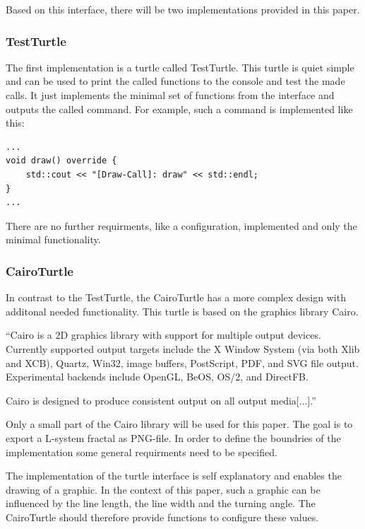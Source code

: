 \documentclass[english]{cpp-hmwk}
\begin{document}
\noindent Based on this interface, there will be two implementations provided in this paper. 

\subsubsection{TestTurtle}

The first implementation is a turtle called TestTurtle. This turtle is quiet simple and can be used to print the called functions to the console and test the made calls.
It just implements the minimal set of functions from the interface and outputs the called command. For example, such a command is implemented like this:

\medskip
\begin{lstlisting}
...
void draw() override {
    std::cout << "[Draw-Call]: draw" << std::endl;
}
...
\end{lstlisting}

There are no further requirments, like a configuration, implemented and only the minimal functionality.

\subsubsection{CairoTurtle}
In contrast to the TestTurtle, the CairoTurtle has a more complex design with additonal needed functionality. This turtle is based on the graphics library Cairo.


``Cairo is a 2D graphics library with support for multiple output devices. Currently supported output targets include the X Window System (via both Xlib and XCB), Quartz, Win32, image buffers, PostScript, PDF, and SVG file output. Experimental backends include OpenGL, BeOS, OS/2, and DirectFB.

Cairo is designed to produce consistent output on all output media[...].''\cite[Cf.]{cairohp}


\noindent Only a small part of the Cairo library will be used for this paper. The goal is to export a L-system fractal as PNG-file. In order to define the boundries of the implementation some general requirments need to be specified.

The implementation of the turtle interface is self explanatory and enables the drawing of a graphic. In the context of this paper, such a graphic can be influenced by the line length, the line width and the turning angle. The CairoTurtle should therefore provide functions to configure these values.
\end{document}
